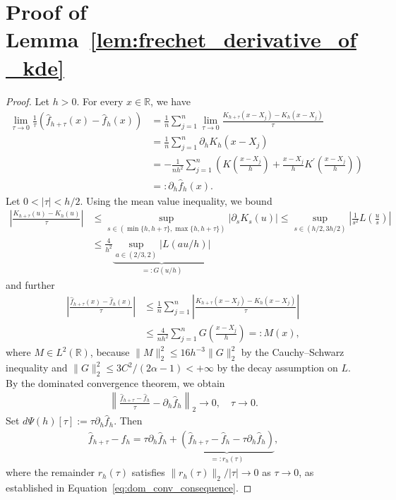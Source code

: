 \section{Proof of Lemma~\ref{lem:frechet_derivative_of_kde}}\label{sec:proof_frechet_derivative_of_kde}

\begin{proof}
    Let $h>0$. For every $x\in\mathbb{R}$, we have
    \begin{align*}
        \lim\limits_{\tau\to0}\frac{1}{\tau}(\hat{f}_{h+\tau}(x)-\hat{f}_h(x))&=\frac{1}{n}\sum_{j=1}^{n}\lim\limits_{\tau\to0}\frac{K_{h+\tau}(x-X_j)-K_{h}(x-X_j)}{\tau}\\&
        =\frac{1}{n}\sum_{j=1}^{n}\partial_hK_h(x-X_j)\\&
        =-\frac{1}{nh^2}\sum_{j=1}^{n}\left(K\left(\frac{x-X_j}{h}\right)+\frac{x-X_j}{h}K^{'}\left(\frac{x-X_j}{h}\right)\right)\\&
        =:\partial_h\hat{f}_h(x).
    \end{align*}
    Let $0<|\tau|<h/2$. Using the mean value inequality, we bound
    \begin{align*}
        \left|\frac{K_{h+\tau}(u)-K_h(u)}{\tau}\right|&\le\sup_{s\in(\min\{h,h+\tau\},\max\{h,h+\tau\})}|\partial_sK_s(u)|\le\sup_{s\in(h/2,3h/2)}\left|\frac{1}{s^2}L\left(\frac{u}{s}\right)\right|\\&
        \le\frac{4}{h^2}\underbrace{\sup_{a\in(2/3,2)}|L(au/h)|}_{=:G(u/h)}
    \end{align*}
    and further
    \begin{align*}
        \left|\frac{\hat{f}_{h+\tau}(x)-\hat{f}_h(x)}{\tau}\right|&\le\frac{1}{n}\sum_{j=1}^{n}\left|\frac{K_{h+\tau}(x-X_j)-K_h(x-X_j)}{\tau}\right|\\&
        \le\frac{4}{nh^2}\sum_{j=1}^{n}G\left(\frac{x-X_j}{h}\right)=:M(x),
    \end{align*}
    where $M\in L^2(\mathbb{R})$, because $\|M\|_2^2\le 16h^{-3}\|G\|_2^2$ by the Cauchy--Schwarz inequality and $\|G\|_2^2\le3C^2/(2\alpha-1)<+\infty$ by the decay assumption on $L$. By the dominated convergence theorem, we obtain
    \begin{align}\label{eq:dom_conv_consequence}
        \left\|\frac{\hat{f}_{h+\tau}-\hat{f}_h}{\tau}-\partial_h\hat{f}_h\right\|_2\to0,\quad\tau\to0.
    \end{align}
    Set $d\Psi(h)[\tau]:=\tau\partial_h\hat{f}_h$. Then
    \begin{align*}
        \hat{f}_{h+\tau}-\hat{f}_h=\tau\partial_h\hat{f}_h+\underbrace{\left(\hat{f}_{h+\tau}-\hat{f}_h-\tau\partial_h\hat{f}_h\right)}_{=:r_h(\tau)},
    \end{align*}
    where the remainder $r_h(\tau)$ satisfies $\|r_h(\tau)\|_2/|\tau|\to0$ as $\tau\to0$, as established in Equation~\eqref{eq:dom_conv_consequence}.


\end{proof}
